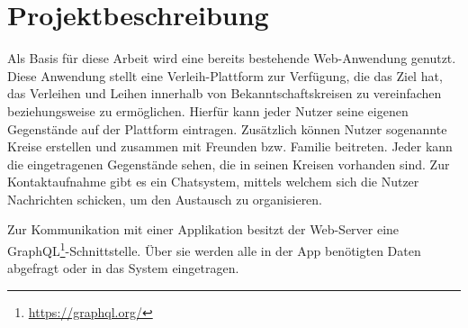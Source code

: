 \section{Projektbeschreibung}
Als Basis für diese Arbeit wird eine bereits bestehende Web-Anwendung genutzt. Diese Anwendung stellt eine Verleih-Plattform zur Verfügung, die das Ziel hat, das Verleihen und Leihen innerhalb von Bekanntschaftskreisen zu vereinfachen beziehungsweise zu ermöglichen. Hierfür kann jeder Nutzer seine eigenen Gegenstände auf der Plattform eintragen. Zusätzlich können Nutzer sogenannte Kreise erstellen und zusammen mit Freunden bzw. Familie beitreten. Jeder kann die eingetragenen Gegenstände sehen, die in seinen Kreisen vorhanden sind. Zur Kontaktaufnahme gibt es ein Chatsystem, mittels welchem sich die Nutzer Nachrichten schicken, um den Austausch zu organisieren. 

Zur Kommunikation mit einer Applikation besitzt der Web-Server eine GraphQL\footnote{\url{https://graphql.org/}}-Schnittstelle. Über sie werden alle in der App benötigten Daten abgefragt oder in das System eingetragen.